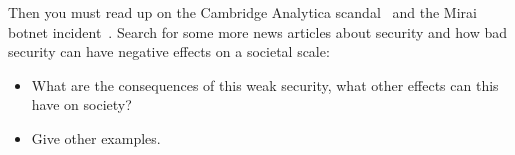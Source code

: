 Then you must read up on the Cambridge Analytica scandal~\cite[\eg][]{%
  wired-cambridge-analytica,
  guardian-cambridge-analytica,
  nytimes-cambridge-analytica,
  wp-cambridge-analytica,
} and the Mirai botnet incident~\cite{schneier-mirai}.
Search for some more news articles about security and how bad security can have 
negative effects on a societal scale:
\begin{frame}
\begin{itemize}
  \item What are the consequences of this weak security, what other effects can 
    this have on society?
  \item Give other examples.
\end{itemize}
\end{frame}


